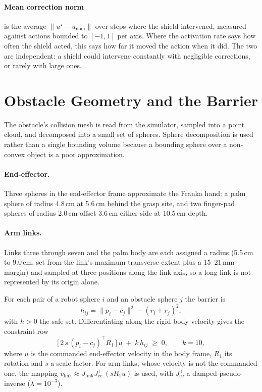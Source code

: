 \documentclass[a4paper,11pt]{report}
\begin{document}
\paragraph{Mean correction norm} is the average $\lVert u^{\star} - u_{\mathrm{nom}} \rVert$ over steps where the shield intervened, measured against actions bounded to $[-1,1]$ per axis. Where the activation rate says how often the shield acted, this says how far it moved the action when it did. The two are independent: a shield could intervene constantly with negligible corrections, or rarely with large ones.

\section{Obstacle Geometry and the Barrier}\label{sec:barrier}

The obstacle's collision mesh is read from the simulator, sampled into a point cloud, and decomposed
into a small set of spheres. Sphere decomposition is used rather than a single bounding volume
because a bounding sphere over a non-convex object is a poor approximation.

\paragraph{End-effector.} Three spheres in the end-effector frame approximate the Franka hand: a
palm sphere of radius 4.8\,cm at 5.6\,cm behind the grasp site, and two finger-pad spheres of
radius 2.0\,cm offset 3.6\,cm either side at 10.5\,cm depth.

\paragraph{Arm links.} Links three through seven and the palm body are each assigned a radius
(5.5\,cm to 9.0\,cm, set from the link's maximum transverse extent plus a 15--21\,mm margin) and
sampled at three positions along the link axis, so a long link is not represented by its origin
alone.

For each pair of a robot sphere $i$ and an obstacle sphere $j$ the barrier is
\begin{equation}
  h_{ij} = \lVert p_i - c_j \rVert^{2} - (r_i + r_j)^{2},
  \label{eq:barrier}
\end{equation}
with $h > 0$ the safe set. Differentiating along the rigid-body velocity gives the constraint row
\begin{equation}
  \bigl[\, 2\,s\,(p_i - c_j)^{\top} R_1 \,\bigr]\, u \;+\; k\,h_{ij} \;\ge\; 0,
  \qquad k = 10,
  \label{eq:constraint_row}
\end{equation}
where $u$ is the commanded end-effector velocity in the body frame, $R_1$ its rotation and $s$ a
scale factor. For arm links, whose velocity is not the commanded one, the mapping
$v_{\mathrm{link}} \approx J_{\mathrm{link}} J_{\mathrm{ee}}^{+}\,(s R_1 u)$ is used, with
$J_{\mathrm{ee}}^{+}$ a damped pseudo-inverse ($\lambda = 10^{-3}$).
\end{document}
